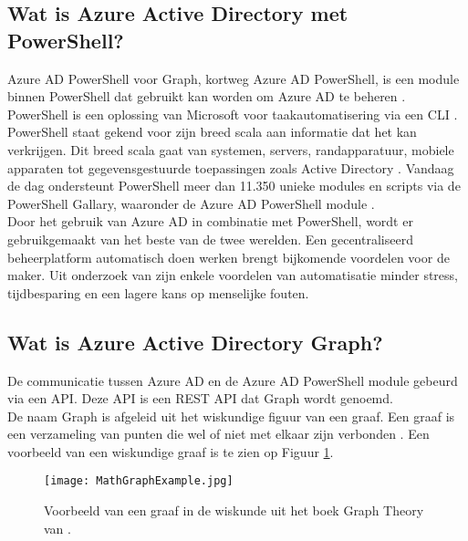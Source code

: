 \subsection{Wat is Azure Active Directory met PowerShell?} 

Azure \ac{AD} PowerShell voor Graph, kortweg Azure \ac{AD} PowerShell, is een module binnen PowerShell dat gebruikt kan worden om Azure \ac{AD} te beheren \autocite{Microsoft2023}. PowerShell is een oplossing van Microsoft voor taakautomatisering via een \ac{CLI} \autocite{Microsoft2022}. \\

PowerShell staat gekend voor zijn breed scala aan informatie dat het kan verkrijgen. Dit breed scala gaat van systemen, servers, randapparatuur, mobiele apparaten tot gegevensgestuurde toepassingen zoals Active Directory \autocite{Hosmer2019}. Vandaag de dag ondersteunt PowerShell meer dan 11.350 unieke modules en scripts via de PowerShell Gallary, waaronder de Azure \ac{AD} PowerShell module \autocite{Microsoft2023a}. \\

Door het gebruik van Azure \ac{AD} in combinatie met PowerShell, wordt er gebruikgemaakt van het beste van de twee werelden. Een gecentraliseerd beheerplatform automatisch doen werken brengt bijkomende voordelen voor de maker. Uit onderzoek van \textcite{Breton2003} zijn enkele voordelen van automatisatie minder stress, tijdbesparing en een lagere kans op menselijke fouten.

\subsection{Wat is Azure Active Directory Graph?}

De communicatie tussen Azure AD en de Azure AD PowerShell module gebeurd via een API. Deze API is een REST API dat Graph wordt genoemd. \\ 

De naam Graph is afgeleid uit het wiskundige figuur van een graaf. Een graaf is een verzameling van punten die wel of niet met elkaar zijn verbonden \autocite{Denaux2022}. Een voorbeeld van een wiskundige graaf is te zien op Figuur \ref{mga}. \\

\begin{figure}
    \texttt{[image: MathGraphExample.jpg]}
    \caption[Voorbeeld wiskundige graaf]{Voorbeeld van een graaf in de wiskunde uit het boek Graph Theory van \textcite{Diestel2010}.}
    \label{mga}
\end{figure}

